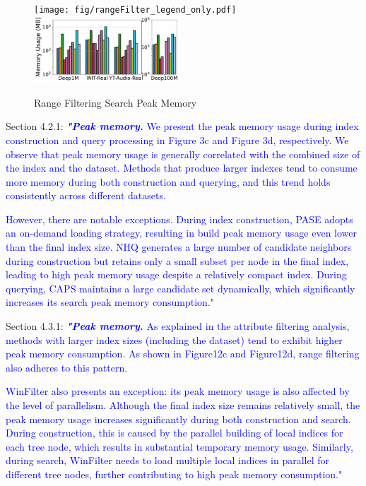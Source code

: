 \documentclass[sigconf, nonacm]{acmart}
\begin{document}
\begin{figure}[htbp]
	\centering
	\texttt{[image: fig/rangeFilter\_legend\_only.pdf]}
	\includegraphics[height=2.5cm]{fig/searchMem/range_memory_comparison.pdf}
	\caption{Range Filtering Search Peak Memory}
	\label{fig:rangeFilter_search_memory_mb}
\end{figure}



Section 4.2.1:
\textcolor{blue}{\textit{\textbf{"Peak memory.}}	
	We present the peak memory usage during index construction and query processing in Figure 3c and Figure 3d, respectively. We observe that peak memory usage is generally correlated with the combined size of the index and the dataset. Methods that produce larger indexes tend to consume more memory during both construction and querying, and this trend holds consistently across different datasets.}

\textcolor{blue}{However, there are notable exceptions. During index construction, PASE adopts an on-demand loading strategy, resulting in build peak memory usage even lower than the final index size. NHQ generates a large number of candidate neighbors during construction but retains only a small subset per node in the final index, leading to high peak memory usage despite a relatively compact index.
During querying, CAPS maintains a large candidate set dynamically, which significantly increases its search peak memory consumption."}

 Section 4.3.1:
\textcolor{blue}{\textit{\textbf{"Peak memory.}}  
	As explained in the attribute filtering analysis, methods with larger index sizes (including the dataset) tend to exhibit higher peak memory consumption. As shown in Figure12c and Figure12d, range filtering also adheres to this pattern.}  

	
	\textcolor{blue}{WinFilter also presents an exception:  its peak memory usage is also affected by the level of parallelism. Although the final index size remains relatively small, the peak memory usage increases significantly during both construction and search. During construction, this is caused by the parallel building of local indices for each tree node, which results in substantial temporary memory usage. Similarly, during search, WinFilter needs to load multiple local indices in parallel for different tree nodes, further contributing to high peak memory consumption."}
\end{document}
